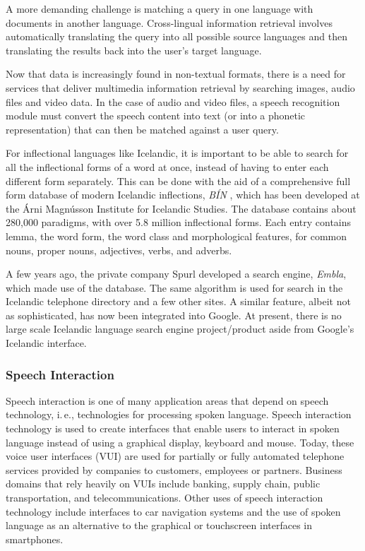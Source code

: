 \documentclass{../../metanetpaper}
\begin{document}
\begin{multicols}{2}
A more demanding challenge is matching a query in one language with documents in another language. Cross-lingual information retrieval involves automatically translating the query into all possible source languages and then translating the results back into the user's target language.

Now that data is increasingly found in non-textual formats, there is a need for services that deliver multimedia information retrieval by searching images, audio files and video data. In the case of audio and video files, a speech recognition module must convert the speech content into text (or into a phonetic representation) that can then be matched against a user query.

For inflectional languages like Icelandic, it is important to be able to search for all the inflectional forms of a word at once, instead of having to enter each different form separately. This can be done with the aid of a comprehensive full form database of modern Icelandic inflections, \textit{BÍN} \cite{bin1}, which has been developed at the Árni Magnússon Institute for Icelandic Studies. The database contains about 280,000 paradigms, with over 5.8 million inflectional forms. Each entry contains lemma, the word form, the word class and morphological features, for common nouns, proper nouns, adjectives, verbs, and adverbs.

A few years ago, the private company Spurl developed a search engine, \textit{Embla}, which made use of the database. The same algorithm is used for search in the Icelandic telephone directory and a few other sites. A similar feature, albeit not as sophisticated, has now been integrated into Google. At present, there is no large scale Icelandic language search engine project/product aside from Google’s Icelandic interface.

\subsubsection{Speech Interaction}

Speech interaction is one of many application areas that depend on speech technology, i.\,e., technologies for processing spoken language. Speech interaction technology is used to create interfaces that enable users to interact in spoken language instead of using a graphical display, keyboard and mouse.  Today, these voice user interfaces (VUI) are used for partially or fully automated telephone services provided by companies to customers, employees or partners. Business domains that rely heavily on VUIs include banking, supply chain, public transportation, and telecommunications. Other uses of speech interaction technology include interfaces to car navigation systems and the use of spoken language as an alternative to the graphical or touchscreen interfaces in smartphones.


\end{multicols}
\end{document}

